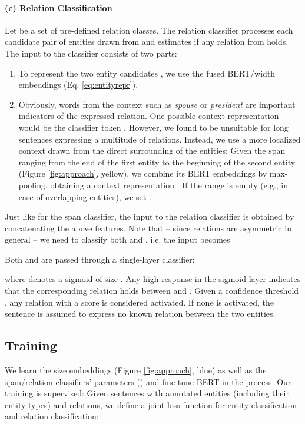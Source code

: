 \documentclass{ecai}
\begin{document}
\paragraph{(c) Relation Classification}
Let  be a set of pre-defined relation classes. The relation classifier processes each candidate pair  of entities drawn from  and estimates if any relation from   holds. 
The input to the classifier consists of two parts:
\begin{enumerate}
    \item To represent the two entity candidates , we use the fused BERT/width embeddings   (Eq.  \ref{eq:entityrepr}).  \item 
Obviously, words from the context such as {\it spouse} or {\it president} are important indicators of the expressed relation. One possible context representation would be the classifier token . However, we found  to be unsuitable for long sentences expressing a multitude of relations. Instead, we use a more localized context drawn from the direct surrounding of the entities: Given the span ranging from the end of the first entity to the beginning of the second entity (Figure \ref{fig:approach}, yellow), we combine its BERT embeddings by max-pooling, obtaining a context representation . If the range is empty (e.g., in case of overlapping entities), we set .
\end{enumerate}

Just like for the span classifier, the input to the relation classifier is obtained by concatenating the above features. Note that -- since relations are  asymmetric in general -- we need to classify both  and , i.e. the input becomes

Both  and  are passed through a single-layer classifier:

where  denotes a sigmoid of size . Any high response in the sigmoid layer indicates that the corresponding relation holds between  and . Given a confidence threshold , any relation with a score  is considered activated. If none is activated, the sentence is assumed to express no known relation between the two entities. 






\subsection{Training}
We learn the size embeddings  (Figure \ref{fig:approach}, blue) as well as the span/relation classifiers' parameters () and fine-tune BERT in the process. Our training is supervised: Given sentences with annotated entities (including their entity types) and relations, we define a joint loss function for entity classification and relation classification:
\end{document}
